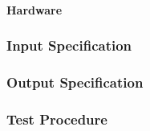 \paragraph{Hardware}

\subsubsection{Input Specification}

\subsubsection{Output Specification}

\subsubsection{Test Procedure}
